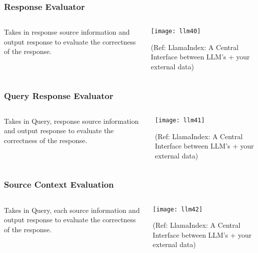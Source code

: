 \begin{frame}[fragile]\frametitle{Response Evaluator}

\begin{columns}
    \begin{column}[T]{0.4\linewidth}
Takes in response source information and output response to evaluate the correctness of the response.

    \end{column}
    \begin{column}[T]{0.6\linewidth}
		\begin{center}
		\texttt{[image: llm40]}

		{\tiny (Ref: LlamaIndex: A Central Interface between LLM’s + your external data)}
		\end{center}
    \end{column}
  \end{columns}
\end{frame}

\begin{frame}[fragile]\frametitle{Query Response Evaluator}

\begin{columns}
    \begin{column}[T]{0.4\linewidth}
Takes in Query, response source information and output response to evaluate the correctness of the response.

    \end{column}
    \begin{column}[T]{0.6\linewidth}
		\begin{center}
		\texttt{[image: llm41]}

		{\tiny (Ref: LlamaIndex: A Central Interface between LLM’s + your external data)}
		\end{center}
    \end{column}
  \end{columns}
\end{frame}


\begin{frame}[fragile]\frametitle{Source Context Evaluation}

\begin{columns}
    \begin{column}[T]{0.4\linewidth}
Takes in Query, each source information and output response to evaluate the correctness of the response.

    \end{column}
    \begin{column}[T]{0.6\linewidth}
		\begin{center}
		\texttt{[image: llm42]}

		{\tiny (Ref: LlamaIndex: A Central Interface between LLM’s + your external data)}
		\end{center}
    \end{column}
  \end{columns}
\end{frame}



